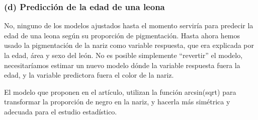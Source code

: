 \documentclass[
]{article}
\begin{document}
\hypertarget{d-predicciuxf3n-de-la-edad-de-una-leona}{%
\subsubsection{(d) Predicción de la edad de una
leona}\label{d-predicciuxf3n-de-la-edad-de-una-leona}}

No, ninguno de los modelos ajustados hasta el momento serviría para
predecir la edad de una leona según su proporción de pigmentación. Hasta
ahora hemos usado la pigmentación de la nariz como variable respuesta,
que era explicada por la edad, área y sexo del león. No es posible
simplemente ``revertir'' el modelo, necesitaríamos estimar un nuevo
modelo dónde la variable respuesta fuera la edad, y la variable
predictora fuera el color de la nariz.

El modelo que proponen en el artículo, utilizan la función arcsin(sqrt)
para transformar la proporción de negro en la nariz, y hacerla más
simétrica y adecuada para el estudio estadístico.
\end{document}

